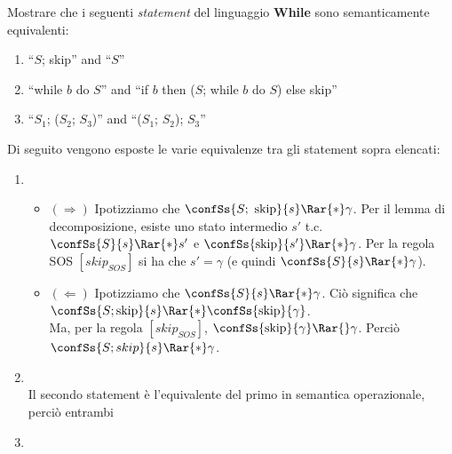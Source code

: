 {
  Mostrare che i seguenti \textit{statement} del linguaggio \textbf{While} sono
  semanticamente equivalenti:
  \begin{enumerate}[label=\alph*)]
    \item ``$S$; skip'' and ``$S$''
    \item ``while $b$ do $S$'' and
      ``if $b$ then ($S$; while $b$ do $S$) else skip''
    \item ``$S_1$; ($S_2$; $S_3$)'' and ``($S_1$; $S_2$); $S_3$''
  \end{enumerate}
}
{
  Di seguito vengono esposte le varie equivalenze tra gli statement sopra
  elencati:

  \begin{enumerate}[label=\alph*)]
    \item {}
    \begin{itemize}
      \item $(\Rightarrow)$ Ipotizziamo che
      $\confSs{S;\mbox{ skip}}{s} \Rar{*} \gamma$. Per il lemma di
      decomposizione, esiste uno stato intermedio $s'$ t.c.
      $\confSs{S}{s} \Rar{*} s'$ e $\confSs{\mbox{skip}}{s'} \Rar{*} \gamma$.
      Per la regola SOS $[skip_{SOS}]$ si ha che $s' = \gamma$ (e quindi
      $\confSs{S}{s} \Rar{*} \gamma$).

      \item $(\Leftarrow)$ Ipotizziamo che $\confSs{S}{s} \Rar{*} \gamma$. Ciò
      significa che
      $\confSs{S; \mbox{skip}}{s} \Rar{*} \confSs{\mbox{skip}}{\gamma}$. \\
      Ma, per la regola $[skip_{SOS}]$,
      $\confSs{\mbox{skip}}{\gamma} \Rar{} \gamma$. Perciò
      $\confSs{S; skip}{s} \Rar{*} \gamma$.
    \end{itemize}


    \item {} \\
      Il secondo statement è
      l'equivalente del primo in semantica operazionale, perciò entrambi

    \item {} 
  \end{enumerate}
}
